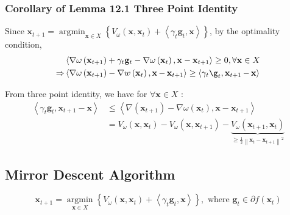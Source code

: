 \subsubsection*{Corollary of Lemma 12.1 Three Point Identity}
Since $\mathbf{x}_{t+1}=\operatorname{argmin}_{\mathbf{x} \in X}\left\{V_{\omega}\left(\mathbf{x}, \mathbf{x}_{t}\right)+\left\langle\gamma_{t} \mathbf{g}_{t}, \mathbf{x}\right\rangle\right\}$, by the optimality condition,
$$
\begin{aligned}
&\left\langle\nabla \omega\left(\mathbf{x}_{t+1}\right)+\gamma_{t} \mathbf{g}_{t}-\nabla \omega\left(\mathbf{x}_{t}\right), \mathbf{x}-\mathbf{x}_{t+1}\right\rangle \geq 0, \forall \mathbf{x} \in X \\
\Rightarrow &\left\langle\nabla \omega\left(\x_{t+1}\right)-\nabla w\left(\x_{t}\right), \x-\x_{t+1}\right\rangle \geq \left\langle \gamma_{t} \g_{t}, \x_{t+1}-\x\right\rangle
\end{aligned}
$$

From three point identity, we have for $\forall \mathbf{x} \in X$ :
$$
\begin{aligned}
\left\langle\gamma_{t} \mathbf{g}_{t}, \mathbf{x}_{t+1}-\mathbf{x}\right\rangle &\leq \left\langle\nabla\left(\mathbf{x}_{t+1}\right)-\nabla \omega\left(\mathbf{x}_{t}\right), \mathbf{x}-\mathbf{x}_{t+1}\right\rangle \\
&=V_{\omega}\left(\mathbf{x}, \mathbf{x}_{t}\right)-V_{\omega}\left(\mathbf{x}, \mathbf{x}_{t+1}\right)-\underbrace{V_{\omega}\left(\mathbf{x}_{t+1}, \mathbf{x}_{t}\right)}_{\geq \frac{1}{2}\left\|\mathbf{x}_{t}-\mathbf{x}_{t+1}\right\|^{2}}
\end{aligned}
$$

\subsection*{Mirror Descent Algorithm}
$$\mathbf{x}_{t+1}=\underset{\mathbf{x} \in X}{\operatorname{argmin}}\left\{V_{\omega}\left(\mathbf{x}, \mathbf{x}_{t}\right)+\left\langle\gamma_{t} \mathbf{g}_{t}, \mathbf{x}\right\rangle\right\}, \text{ where } \mathbf{g}_{t} \in \partial f\left(\mathbf{x}_{t}\right)$$
